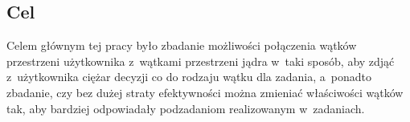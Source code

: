\subsection{Cel}
%
\indent
	Celem głównym tej pracy było zbadanie możliwości połączenia wątków przestrzeni użytkownika z~wątkami przestrzeni jądra w~taki sposób,
	aby zdjąć z~użytkownika ciężar decyzji co do rodzaju wątku dla zadania, a~ponadto zbadanie, czy bez dużej straty efektywności można  
	zmieniać właściwości wątków tak, aby bardziej odpowiadały podzadaniom realizowanym w~zadaniach.
\par
